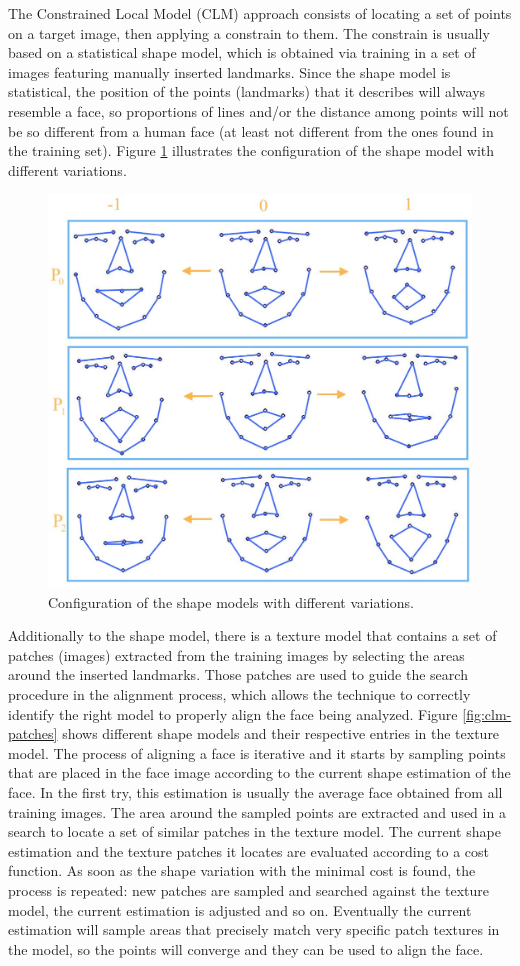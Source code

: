 The Constrained Local Model (CLM) approach consists of locating a set of points on a target image, then applying a constrain to them. The constrain is usually based on a statistical shape model, which is obtained via training in a set of images featuring manually inserted landmarks. Since the shape model is statistical, the position of the points (landmarks) that it describes will always resemble a face, so proportions of lines and/or the distance among points will not be so different from a human face (at least not different from the ones found in the training set). Figure \ref{fig:clm-model-variation} illustrates the configuration of the shape model with different variations.

\begin{figure}[ht]
    \centering
    \includegraphics[width=0.6\linewidth]{figures/clm-model-variation.jpg}
    \caption{Configuration of the shape models with different variations\parencite{yu2010facial}.}
    \label{fig:clm-model-variation}
\end{figure}

Additionally to the shape model, there is a texture model that contains a set of patches (images) extracted from the training images by selecting the areas around the inserted landmarks. Those patches are used to guide the search procedure in the alignment process, which allows the technique to correctly identify the right model to properly align the face being analyzed. Figure \ref{fig:clm-patches} shows different shape models and their respective entries in the texture model. The process of aligning a face is iterative and it starts by sampling points that are placed in the face image according to the current shape estimation of the face. In the first try, this estimation is usually the average face obtained from all training images. The area around the sampled points are extracted and used in a search to locate a set of similar patches in the texture model. The current shape estimation and the texture patches it locates are evaluated according to a cost function. As soon as the shape variation with the minimal cost is found, the process is repeated: new patches are sampled and searched against the texture model, the current estimation is adjusted and so on. Eventually the current estimation will sample areas that precisely match very specific patch textures in the model, so the points will converge and they can be used to align the face.

